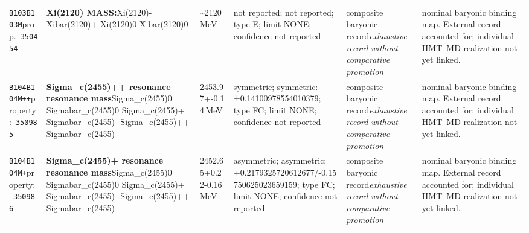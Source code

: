 \begin{landscape}
\begin{longtable}{L{1.85cm}L{4.45cm}L{2.35cm}L{4.05cm}L{3.35cm}L{7.15cm}}
\texttt{B103}\newline \texttt{B103M}\newline prop.\ \texttt{350454} & \textbf{Xi(2120) MASS:}\newline Xi(2120)- \textbar{}\allowbreak{} Xibar(2120)+ \textbar{}\allowbreak{} Xi(2120)0 \textbar{}\allowbreak{} Xibar(2120)0 & \textasciitilde{}2120\,MeV & not reported; not reported; type E; limit NONE; confidence not reported & composite baryonic record\newline \emph{exhaustive record without comparative promotion} & nominal baryonic binding map. External record accounted for; individual HMT--MD realization not yet linked. \\
\texttt{B104}\newline \texttt{B104M++}\newline property:\ \texttt{350985} & \textbf{Sigma\_\allowbreak{}c(2455)++ resonance resonance mass}\newline Sigma\_\allowbreak{}c(2455)0 \textbar{}\allowbreak{} Sigmabar\_\allowbreak{}c(2455)0 \textbar{}\allowbreak{} Sigma\_\allowbreak{}c(2455)+ \textbar{}\allowbreak{} Sigmabar\_\allowbreak{}c(2455)- \textbar{}\allowbreak{} Sigma\_\allowbreak{}c(2455)++ \textbar{}\allowbreak{} Sigmabar\_\allowbreak{}c(2455)-- & 2453.97+-0.14\,MeV & symmetric; symmetric: ±0.14100978554010379; type FC; limit NONE; confidence not reported & composite baryonic record\newline \emph{exhaustive record without comparative promotion} & nominal baryonic binding map. External record accounted for; individual HMT--MD realization not yet linked. \\
\texttt{B104}\newline \texttt{B104M+}\newline property:\ \texttt{350986} & \textbf{Sigma\_\allowbreak{}c(2455)+ resonance resonance mass}\newline Sigma\_\allowbreak{}c(2455)0 \textbar{}\allowbreak{} Sigmabar\_\allowbreak{}c(2455)0 \textbar{}\allowbreak{} Sigma\_\allowbreak{}c(2455)+ \textbar{}\allowbreak{} Sigmabar\_\allowbreak{}c(2455)- \textbar{}\allowbreak{} Sigma\_\allowbreak{}c(2455)++ \textbar{}\allowbreak{} Sigmabar\_\allowbreak{}c(2455)-- & 2452.65+0.22-0.16\,MeV & asymmetric; asymmetric: +0.2179325720612677/-0.15750625023659159; type FC; limit NONE; confidence not reported & composite baryonic record\newline \emph{exhaustive record without comparative promotion} & nominal baryonic binding map. External record accounted for; individual HMT--MD realization not yet linked. \\

\end{longtable}
\end{landscape}
